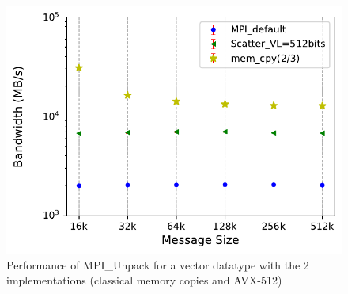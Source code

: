 \documentclass[conference]{IEEEtran}
\begin{document}
\begin{figure}[h]
    \centering
    \includegraphics[width=\linewidth]{to_self_avx_scatter_20tests_with_memcpy.pdf}
    \caption{Performance of MPI\_Unpack for a vector datatype with the 2 implementations (classical memory copies and AVX-512)}
    \label{fig:scatter20}
\end{figure}
\end{document}
